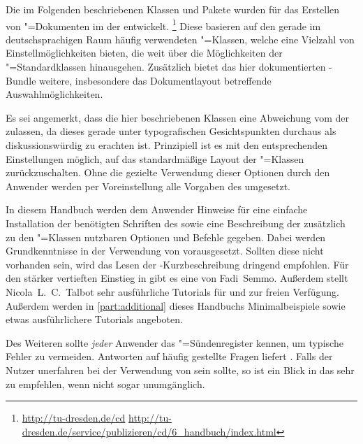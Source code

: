 \addchap*{\prefacename}
Die im Folgenden beschriebenen Klassen und Pakete wurden für das Erstellen von 
"=Dokumenten im \CD der \TnUD entwickelt.%
\footnote{%
  \url{http://tu-dresden.de/cd}\hfill
  \url{http://tu-dresden.de/service/publizieren/cd/6_handbuch/index.html}%
}
Diese basieren auf den gerade im deutschsprachigen Raum häufig verwendeten 
\KOMAScript"=Klassen, welche eine Vielzahl von Einstellmöglichkeiten bieten, 
die weit über die Möglichkeiten der "=Standardklassen 
hinausgehen. Zusätzlich bietet das hier dokumentierten \TUDScript-Bundle 
weitere, insbesondere das Dokumentlayout betreffende Auswahlmöglichkeiten.

Es sei angemerkt, dass die hier beschriebenen Klassen eine Abweichung vom \CD 
der \TnUD zulassen, da dieses gerade unter typografischen Gesichtspunkten 
durchaus als diskussionswürdig zu erachten ist. Prinzipiell ist es mit den 
entsprechenden Einstellungen möglich, auf das standardmäßige Layout der 
\KOMAScript"=Klassen zurückzuschalten. Ohne die gezielte Verwendung dieser 
Optionen durch den Anwender werden per Voreinstellung alle Vorgaben des \CDs 
umgesetzt.

In diesem Handbuch werden dem Anwender Hinweise für eine einfache Installation 
der benötigten Schriften des \CDs sowie eine Beschreibung der zusätzlich zu den 
\KOMAScript"=Klassen nutzbaren Optionen und Befehle gegeben. Dabei werden 
Grundkenntnisse in der Verwendung von  vorausgesetzt. Sollten 
diese nicht vorhanden sein, wird das Lesen der -Kurzbeschreibung
dringend empfohlen. Für den stärker vertieften Einstieg in  gibt 
es eine  von 
Fadi~Semmo. Außerdem stellt Nicola~L.~C.~Talbot sehr ausführliche Tutorials für 
 und 
 zur freien 
Verfügung. Außerdem werden in \autoref{part:additional} dieses Handbuchs 
Minimalbeispiele sowie etwas ausführlichere Tutorials angeboten.

Des Weiteren sollte \emph{jeder} Anwender das "=Sündenregister 
kennen, um typische Fehler zu vermeiden. Antworten auf häufig gestellte Fragen 
liefert . Falls der 
Nutzer unerfahren bei der Verwendung von \KOMAScript{} sein sollte, so ist ein 
Blick in das  sehr zu empfehlen, wenn nicht 
sogar unumgänglich.

